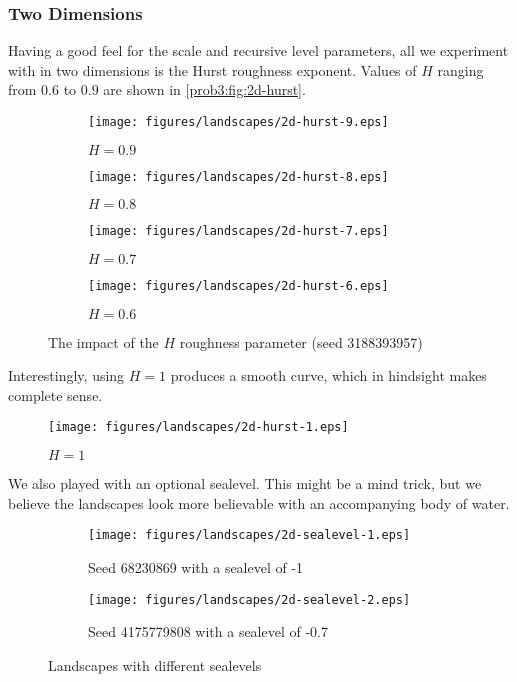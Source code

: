\subsubsection{Two Dimensions}
Having a good feel for the scale and recursive level parameters, all we experiment with in two dimensions is the Hurst roughness exponent.
Values of $H$ ranging from $0.6$ to $0.9$ are shown in \autoref{prob3:fig:2d-hurst}.

\begin{figure}[H]
    \centering
    \begin{subfigure}[t]{0.55\textwidth}
        \centering
        \texttt{[image: figures/landscapes/2d-hurst-9.eps]}
        \caption{$H = 0.9$}
    \end{subfigure}%
    \begin{subfigure}[t]{0.55\textwidth}
        \centering
        \texttt{[image: figures/landscapes/2d-hurst-8.eps]}
        \caption{$H = 0.8$}
    \end{subfigure}%

    \begin{subfigure}[b]{0.55\textwidth}
        \centering
        \texttt{[image: figures/landscapes/2d-hurst-7.eps]}
        \caption{$H = 0.7$}
    \end{subfigure}%
    \begin{subfigure}[b]{0.55\textwidth}
        \centering
        \texttt{[image: figures/landscapes/2d-hurst-6.eps]}
        \caption{$H = 0.6$}
    \end{subfigure}%
    \caption{The impact of the $H$ roughness parameter (seed 3188393957)}\label{prob3:fig:2d-hurst}
\end{figure}

Interestingly, using $H=1$ produces a smooth curve, which in hindsight makes complete sense.

\begin{figure}[H]
    \centering
    \texttt{[image: figures/landscapes/2d-hurst-1.eps]}
    \caption{$H = 1$}\label{prob3:fig:2d-hurst-1}
\end{figure}

We also played with an optional sealevel.
This might be a mind trick, but we believe the landscapes look more believable with an accompanying body of water.

\begin{figure}[H]
    \centering
    \begin{subfigure}[t]{0.9\textwidth}
        \centering
        \texttt{[image: figures/landscapes/2d-sealevel-1.eps]}
        \caption{Seed 68230869 with a sealevel of -1}
    \end{subfigure}%

    \begin{subfigure}[b]{0.9\textwidth}
        \centering
        \texttt{[image: figures/landscapes/2d-sealevel-2.eps]}
        \caption{Seed 4175779808 with a sealevel of -0.7}
    \end{subfigure}%
    \caption{Landscapes with different sealevels}\label{prob3:fig:2d-sealevel}
\end{figure}
